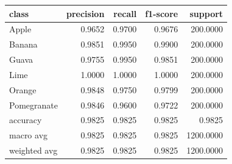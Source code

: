 \begin{tabular}{lrrrr}
\toprule
class & precision & recall & f1-score & support \\
\midrule
Apple & 0.9652 & 0.9700 & 0.9676 & 200.0000 \\
Banana & 0.9851 & 0.9950 & 0.9900 & 200.0000 \\
Guava & 0.9755 & 0.9950 & 0.9851 & 200.0000 \\
Lime & 1.0000 & 1.0000 & 1.0000 & 200.0000 \\
Orange & 0.9848 & 0.9750 & 0.9799 & 200.0000 \\
Pomegranate & 0.9846 & 0.9600 & 0.9722 & 200.0000 \\
accuracy & 0.9825 & 0.9825 & 0.9825 & 0.9825 \\
macro avg & 0.9825 & 0.9825 & 0.9825 & 1200.0000 \\
weighted avg & 0.9825 & 0.9825 & 0.9825 & 1200.0000 \\
\bottomrule
\end{tabular}

